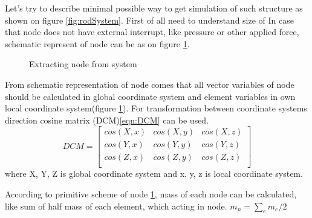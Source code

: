 Let's try to describe minimal possible way to get simulation of such structure as
 shown on figure \ref{fig:rodSystem}. First of all need to understand size of 
In case that node does not have external interrupt, like pressure or other
applied force, schematic represent of node can be as on figure
\ref{fig:nodeExtract}.\par
\begin{figure}[ht]
  \centering
      
  \caption{Extracting node from system}\label{fig:nodeExtract}
\end{figure}
From schematic representation of node comes that all vector variables of node
should be calculated in global coordinate system and element variables in own
local coordinate system(figure \ref{fig:nodeExtract}). For transformation between
coordinate systems direction cosine matrix (DCM)\eqref{eqn:DCM} can be used.
\begin{equation}\label{eqn:DCM}
  DCM= \begin{bmatrix}
    cos(X,x)&cos(X,y)&cos(X,z)\\
    cos(Y,x)&cos(Y,y)&cos(Y,z)\\
    cos(Z,x)&cos(Z,y)&cos(Z,z)\\
   \end{bmatrix} 
\end{equation}
where {X, Y, Z} is global coordinate system and {x, y, z} is local coordinate
system.\par According to primitive scheme of node \ref{fig:nodeExtract}, mass of
each node can be calculated, like sum of half mass of each element, which acting
in node. $m_n=\sum_{e}m_e/2$\par